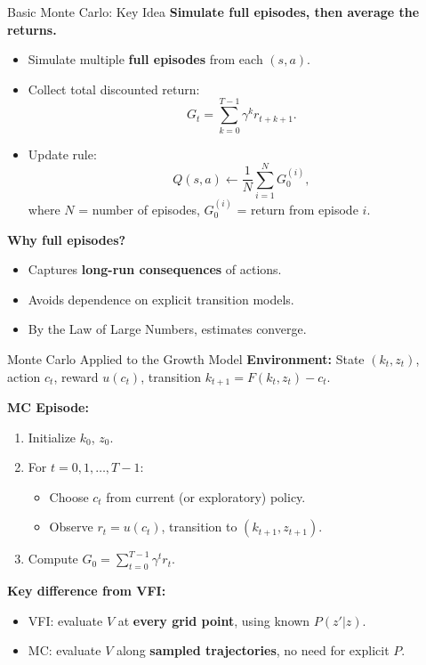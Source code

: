 \documentclass[10pt,english,aspectratio=169]{beamer}
\begin{document}
\begin{frame}{Basic Monte Carlo: Key Idea}
\textbf{Simulate full episodes, then average the returns.}

\begin{itemize}
    \item Simulate multiple \textbf{full episodes} from each $(s,a)$.
    \item Collect total discounted return:
    \[
        G_t = \sum_{k=0}^{T-1} \gamma^k r_{t+k+1}.
    \]
    \item Update rule:
    \[
        Q(s,a) \leftarrow \frac{1}{N} \sum_{i=1}^{N} G_0^{(i)},
    \]
    where $N$ = number of episodes, $G_0^{(i)}$ = return from episode $i$.
\end{itemize}

\vspace{0.3cm}
\textbf{Why full episodes?}
\begin{itemize}
    \item Captures \textbf{long-run consequences} of actions.
    \item Avoids dependence on explicit transition models.
    \item By the Law of Large Numbers, estimates converge.
\end{itemize}
\end{frame}

\begin{frame}{Monte Carlo Applied to the Growth Model}
\textbf{Environment:} State $(k_t, z_t)$, action $c_t$, reward $u(c_t)$, transition $k_{t+1} = F(k_t,z_t) - c_t$.

\vspace{0.3cm}
\textbf{MC Episode:}
\begin{enumerate}
    \item Initialize $k_0$, $z_0$.
    \item For $t = 0, 1, \ldots, T-1$:
    \begin{itemize}
        \item Choose $c_t$ from current (or exploratory) policy.
        \item Observe $r_t = u(c_t)$, transition to $(k_{t+1}, z_{t+1})$.
    \end{itemize}
    \item Compute $G_0 = \sum_{t=0}^{T-1} \gamma^t r_t$.
\end{enumerate}

\vspace{0.2cm}
\textbf{Key difference from VFI:}
\begin{itemize}
    \item VFI: evaluate $V$ at \textbf{every grid point}, using known $P(z'|z)$.
    \item MC: evaluate $V$ along \textbf{sampled trajectories}, no need for explicit $P$.
\end{itemize}
\end{frame}
\end{document}
